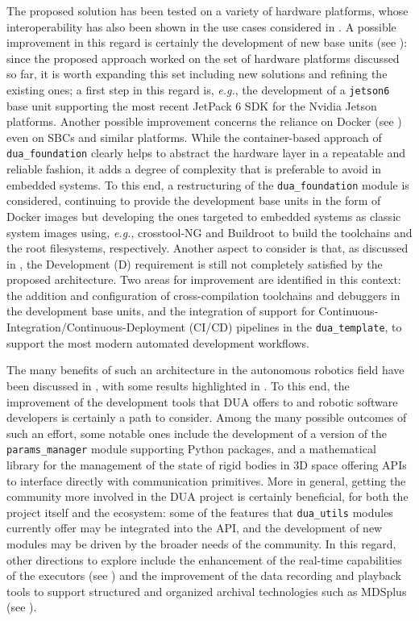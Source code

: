 The proposed solution has been tested on a variety of hardware platforms, whose interoperability has also been shown in the use cases considered in . A possible improvement in this regard is certainly the development of new base units (see ): since the proposed approach worked on the set of hardware platforms discussed so far, it is worth expanding this set including new solutions and refining the existing ones; a first step in this regard is, \emph{e.g.}, the development of a \texttt{jetson6} base unit supporting the most recent JetPack 6 SDK for the Nvidia Jetson platforms. Another possible improvement concerns the reliance on Docker (see ) even on SBCs and similar platforms. While the container-based approach of \texttt{dua\_foundation} clearly helps to abstract the hardware layer in a repeatable and reliable fashion, it adds a degree of complexity that is preferable to avoid in embedded systems. To this end, a restructuring of the \texttt{dua\_foundation} module is considered, continuing to provide the development base units in the form of Docker images but developing the ones targeted to embedded systems as classic system images using, \emph{e.g.}, crosstool-NG \cite{morin_crosstool-ng_nodate} and Buildroot \cite{korsgaard_buildroot_nodate} to build the toolchains and the root filesystems, respectively. Another aspect to consider is that, as discussed in , the Development (D) requirement is still not completely satisfied by the proposed architecture. Two areas for improvement are identified in this context: the addition and configuration of cross-compilation toolchains and debuggers in the development base units, and the integration of support for Continuous-Integration/Continuous-Deployment (CI/CD) pipelines in the \texttt{dua\_template}, to support the most modern automated development workflows.

The many benefits of such an architecture in the autonomous robotics field have been discussed in , with some results highlighted in . To this end, the improvement of the development tools that DUA offers to \ROS and robotic software developers is certainly a path to consider. Among the many possible outcomes of such an effort, some notable ones include the development of a version of the \texttt{params\_manager} module supporting Python packages, and a mathematical library for the management of the state of rigid bodies in 3D space offering APIs to interface directly with \ROS communication primitives. More in general, getting the community more involved in the DUA project is certainly beneficial, for both the project itself and the \ROS ecosystem: some of the features that \texttt{dua\_utils} modules currently offer may be integrated into the \ROS API, and the development of new modules may be driven by the broader needs of the community. In this regard, other directions to explore include the enhancement of the real-time capabilities of the \ROS executors (see ) and the improvement of the \ROS data recording and playback tools to support structured and organized archival technologies such as MDSplus (see ).

